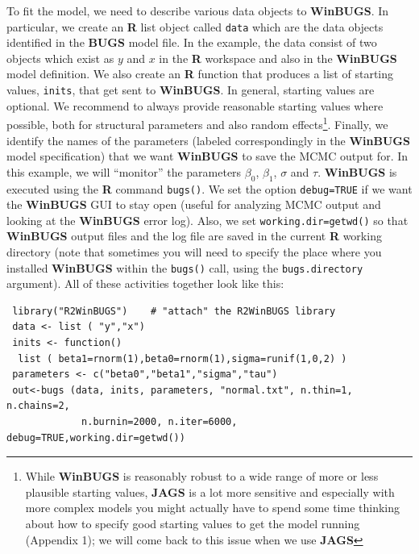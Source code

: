 To fit the model, we need to describe various data objects to {\bf
  WinBUGS}. In particular,
we create an {\bf R} list object called \mbox{\tt data} which
are the data objects identified in the {\bf BUGS} model file.
 In the example, the
data consist of two objects which exist as $y$ and $x$ in the {\bf R}
workspace and also in the {\bf WinBUGS} model definition.
 We also create an {\bf R} function
that produces a list of starting values, \mbox{\tt inits}, that get sent to
{\bf WinBUGS}. In general, starting
values are optional. We recommend to always provide reasonable
starting values where possible, both for structural parameters and
also random effects\footnote{While {\bf WinBUGS} is reasonably robust to a
  wide range of more or less plausible starting values, {\bf JAGS} is
  a lot more sensitive and especially with more complex models you
  might actually have to spend some time thinking about how to specify
  good starting values to get the model running (Appendix 1); we
  will come back to this issue when we use {\bf JAGS}}. 
 Finally, we identify
the names of the parameters (labeled correspondingly in the {\bf WinBUGS}
model specification) that we want {\bf WinBUGS} to save the MCMC output
for. In this example, we will ``monitor'' the parameters
$\beta_0$, $\beta_1$, $\sigma$ and $\tau$.
{\bf WinBUGS} is executed using the {\bf R} command
\mbox{\tt bugs()}.
We set the option \mbox{\tt debug=TRUE} if we want the {\bf WinBUGS}
GUI to stay open (useful for analyzing MCMC output and looking at the
{\bf WinBUGS} error log). Also, we set \mbox{\tt working.dir=getwd()}
so that {\bf WinBUGS} output files and the log file are saved in the
current {\bf R} working directory (note that sometimes you will need to specify the place where you installed {\bf WinBUGS} within the \mbox{\tt bugs()} call, using the \mbox{\tt bugs.directory} argument).
  All of these activities together look like this:
{\small
\begin{verbatim}
 library("R2WinBUGS")    # "attach" the R2WinBUGS library
 data <- list ( "y","x")
 inits <- function()
  list ( beta1=rnorm(1),beta0=rnorm(1),sigma=runif(1,0,2) )
 parameters <- c("beta0","beta1","sigma","tau")
 out<-bugs (data, inits, parameters, "normal.txt", n.thin=1, n.chains=2,
             n.burnin=2000, n.iter=6000, debug=TRUE,working.dir=getwd())
\end{verbatim}
}

